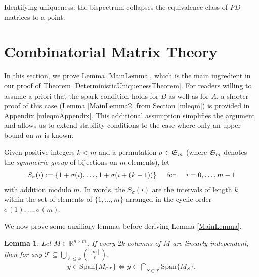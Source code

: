 \documentclass[journal, onecolumn]{IEEEtran}
\newtheorem{lemma}{Lemma}
\begin{document}
Identifying uniqueness: the bispectrum collapses the equivalence class of $PD$ matrices to a point.


\appendices
\section{Combinatorial Matrix Theory}\label{appendixA}

In this section, we prove Lemma \ref{MainLemma}, which is the main ingredient in our proof of Theorem \ref{DeterministicUniquenessTheorem}. For readers willing to assume a priori that the spark condition holds for $B$ as well as for $A$, a shorter proof of this case (Lemma \ref{MainLemma2} from Section \ref{mleqm}) is provided in Appendix \ref{mleqmAppendix}. This additional assumption simplifies the argument and allows us to extend stability conditions to the case where only an upper bound on $m$ is known. 

Given positive integers $k < m$ and a permutation $\sigma \in \frak{S}_m$ (where $\frak{S}_m$ denotes the \textit{symmetric group} of bijections on $m$ elements), let
\begin{align}
S_\sigma(i) := \{1+\sigma(i), \ldots, 1+\sigma(i + (k-1)) \} \indent \text{for} \indent i = 0, \ldots, m-1
\end{align}
%
with addition modulo $m$. In words, the $S_\sigma(i)$ are the intervals of length $k$ within the set of elements of $\{1, \ldots, m\}$ arranged in the cyclic order $\sigma(1), \ldots, \sigma(m)$.

We now prove some auxiliary lemmas before deriving Lemma \ref{MainLemma}.


\begin{lemma}\label{SpanIntersectionLemma}
Let $M \in \mathbb{R}^{n \times m}$. If every $2k$ columns of $M$ are linearly independent, then for any $\mathcal{T} \subseteq \bigcup_{\ell \leq k} {[m] \choose \ell}$,
\begin{align}
y \in \text{Span}\{M_{\cap \mathcal{T}}\}  \Longleftrightarrow y \in \bigcap_{S \in \mathcal{T}} \text{Span}\{M_S\}.
\end{align}
\end{lemma}
\end{document}
